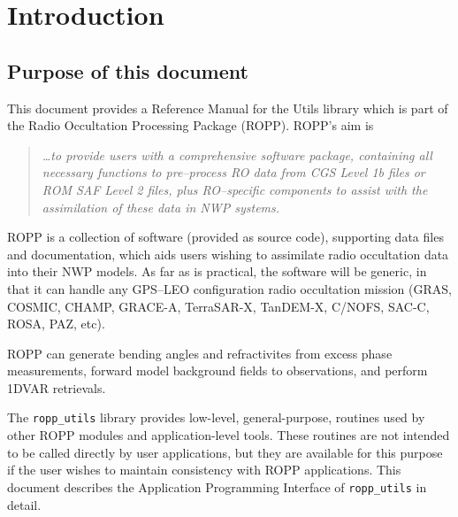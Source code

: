 
\chapter{Introduction}\label{chap:introduction}

\section{Purpose of this document}

This document provides a Reference Manual for the Utils
library which is part of the Radio Occultation Processing Package
(ROPP). ROPP's aim is
%
\begin{quote}
  \emph{\ldots{}to provide users with a comprehensive software
    package, containing all necessary functions to pre--process RO
    data from CGS Level 1b files or ROM SAF Level 2 files, plus
    RO--specific components to assist with the assimilation of these
    data in NWP systems.}
\end{quote}
%
ROPP is a collection of software (provided as source code), supporting
data files and documentation, which aids users wishing to assimilate
radio occultation data into their NWP models. As far as is practical,
the software will be generic, in that it can handle any GPS--LEO
configuration radio occultation mission (GRAS, COSMIC, CHAMP, GRACE-A, 
TerraSAR-X, TanDEM-X, C/NOFS, SAC-C, ROSA, PAZ, etc). 

ROPP can generate bending angles and refractivites from excess phase 
measurements, forward model background fields to observations, 
and perform 1DVAR retrievals. 

The \texttt{ropp\_utils} library provides low-level, general-purpose,
routines used by other ROPP modules and application-level tools.
These routines are not intended to be called directly by user
applications, but they are available for this purpose if the user
wishes to maintain consistency with ROPP applications.
This document describes the Application Programming Interface  of
\texttt{ropp\_utils} in detail.

